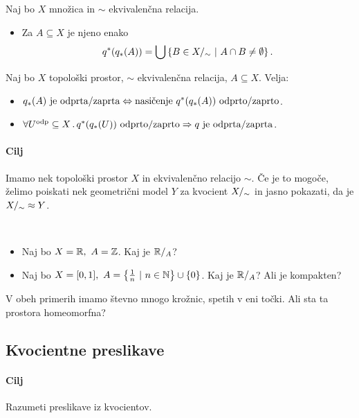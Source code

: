 \newpage
\begin{definicija}
    Naj bo \(X\) množica in \(\sim\) ekvivalenčna relacija. 
    \begin{itemize}
        \item Za \(A \subseteq X\) je njeno  enako \[q^{*}(q_{*}(A)) = \bigcup \left\{B \in {X/_\sim} \ | \ A \cap B \neq \emptyset\right\}.\]
    \end{itemize}
\end{definicija}

\begin{trditev}
    Naj bo \(X\) topološki prostor, \(\sim\) ekvivalenčna relacija, \(A \subseteq X\). Velja:
    \begin{itemize}
        \item \(\img{q}(A) \ \text{je odprta/zaprta} \liff  \text{nasičenje} \ \invimg{q}(\img{q}(A)) \ \text{odprto/zaprto}\). 
        \item \(\forall U^{\text{odp}} \subseteq X \,.\, q^{*}(q_{*}(U)) \ \text{odprto/zaprto} \Rightarrow q \ \text{je odprta/zaprta}\).
    \end{itemize}
\end{trditev}

\paragraph{Cilj} Imamo nek topološki prostor \(X\) in ekvivalenčno relacijo \(\sim\). Če je to mogoče, želimo poiskati nek geometrični model \(Y\) za kvocient \({X/_\sim}\) in jasno pokazati, da je \({X/_\sim} \approx Y\).

\begin{primer}
    \
    \begin{itemize}
        \item Naj bo \(X = \mathbb{R}, \ A = \mathbb{Z}\). Kaj je \(\mathbb{R}/_{A}\)?
        \item Naj bo \(X = [0,1], \ A = \left\{\frac{1}{n} \ | \ n \in \mathbb{N}\right\} \cup \left\{0\right\}\). Kaj je \(\mathbb{R}/_{A}\)? Ali je kompakten?
    \end{itemize}
    V obeh primerih imamo števno mnogo krožnic, spetih v eni točki. Ali sta ta prostora homeomorfna?
\end{primer}

\subsection{Kvocientne preslikave}
\paragraph{Cilj} Razumeti preslikave iz kvocientov.

